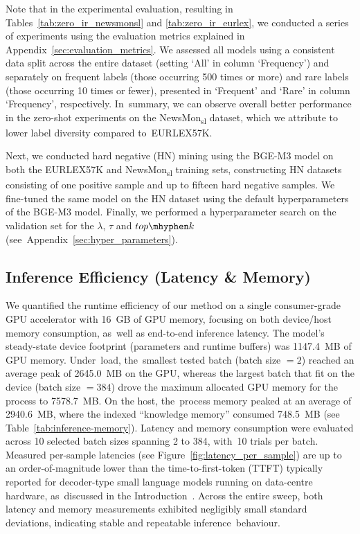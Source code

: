 \documentclass[make,article,accept,pdftex,moreauthors]{Definitions/mdpi}
\begin{document}
Note that in the experimental evaluation, resulting in  Tables~\ref{tab:zero_ir_newsmonsl} and \ref{tab:zero_ir_eurlex}, we conducted a series of experiments using the evaluation metrics explained in Appendix~\ref{sec:evaluation_metrics}. 
We assessed all models using a consistent data split across the entire dataset (setting `All' in column `Frequency') and separately on frequent labels (those occurring 500 times or more) and rare labels (those occurring 10 times or fewer), presented in `Frequent' and `Rare' in column `Frequency', respectively. In~summary, we can observe overall better performance in the zero-shot experiments on the NewsMon\textsubscript{sl} dataset, which we attribute to lower label diversity compared to~EURLEX57K.

Next, we conducted hard negative (HN) mining using the BGE-M3 model on both the EURLEX57K and NewsMon\textsubscript{sl} training sets, constructing HN datasets consisting of one positive sample and up to fifteen hard negative samples. 
We fine-tuned the same model on the HN dataset using the default hyperparameters of the BGE-M3 model. 
Finally, we performed a hyperparameter search on the validation set for the $\lambda$, $\tau$ and $top\mhyphen k$ \mbox{(see Appendix~\ref{sec:hyper_parameters}). }

\subsection*{Inference Efficiency (Latency \& Memory)}
\label{sec:inference-efficiency}



We quantified the runtime efficiency of our method on a single consumer-grade GPU accelerator with 16~GB of GPU memory, focusing on both device/host memory consumption, as~well as end-to-end inference latency. 
The model’s steady-state device footprint (parameters and runtime buffers) was 1147.4~MB of GPU memory. Under~load, the~smallest tested batch (batch size $=2$) reached an average peak of 2645.0~MB on the GPU, whereas the largest batch that fit on the device (batch size $=384$) drove the maximum allocated GPU memory for the process to 7578.7~MB. 
On the host, the~process memory peaked at an average of 2940.6~MB, where the indexed ``knowledge memory'' consumed 748.5~MB (see Table~\ref{tab:inference-memory}). 
Latency and memory consumption were evaluated across 10 selected batch sizes spanning 2 to 384, with~10 trials per batch. 
Measured per-sample latencies (see Figure~\ref{fig:latency_per_sample}) are up to an order-of-magnitude lower than the time-to-first-token (TTFT) typically reported for decoder-type small language models running on data-centre hardware, as~discussed in the Introduction~\citep{lu2025smalllanguagemodelssurvey}.
Across the entire sweep, both latency and memory measurements exhibited negligibly small standard deviations, indicating stable and repeatable inference~behaviour.
\end{document}
